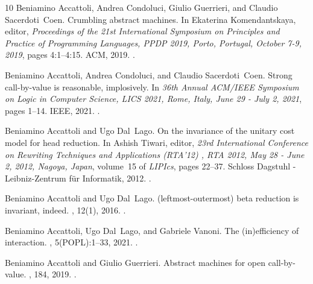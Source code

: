 \documentclass[10pt,a4paper]{article}
\theoremstyle{remark}
\begin{document}
\begin{thebibliography}{10}
Beniamino Accattoli, Andrea Condoluci, Giulio Guerrieri, and Claudio
  Sacerdoti~Coen.
\newblock Crumbling abstract machines.
\newblock In Ekaterina Komendantskaya, editor, {\em Proceedings of the 21st
  International Symposium on Principles and Practice of Programming Languages,
  { PPDP} 2019, Porto, Portugal, October 7-9, 2019}, pages 4:1--4:15. {ACM},
  2019.
\newblock \href {https://doi.org/10.1145/3354166.3354169}
  {}.

Beniamino Accattoli, Andrea Condoluci, and Claudio Sacerdoti~Coen.
\newblock Strong call-by-value is reasonable, implosively.
\newblock In {\em 36th Annual {ACM/IEEE} Symposium on Logic in Computer
  Science, {LICS} 2021, Rome, Italy, June 29 - July 2, 2021}, pages 1--14.
  {IEEE}, 2021.
\newblock \href {https://doi.org/10.1109/LICS52264.2021.9470630}
  {}.

Beniamino Accattoli and Ugo Dal~Lago.
\newblock On the invariance of the unitary cost model for head reduction.
\newblock In Ashish Tiwari, editor, {\em 23rd International Conference on
  Rewriting Techniques and Applications (RTA'12) , {RTA} 2012, May 28 - June 2,
  2012, Nagoya, Japan}, volume~15 of {\em LIPIcs}, pages 22--37. Schloss
  Dagstuhl - Leibniz-Zentrum f{\"{u}}r Informatik, 2012.
\newblock \href {https://doi.org/10.4230/LIPICS.RTA.2012.22}
  {}.

Beniamino Accattoli and Ugo Dal~Lago.
\newblock (leftmost-outermost) beta reduction is invariant, indeed.
, 12(1), 2016.
\newblock \href {https://doi.org/10.2168/LMCS-12(1:4)2016}
  {}.

Beniamino Accattoli, Ugo Dal~Lago, and Gabriele Vanoni.
\newblock The (in)efficiency of interaction.
, 5({POPL}):1--33, 2021.
\newblock \href {https://doi.org/10.1145/3434332} {}.

Beniamino Accattoli and Giulio Guerrieri.
\newblock Abstract machines for open call-by-value.
, 184, 2019.
\newblock \href {https://doi.org/10.1016/J.SCICO.2019.03.002}
  {}.


\end{thebibliography}
\end{document}
